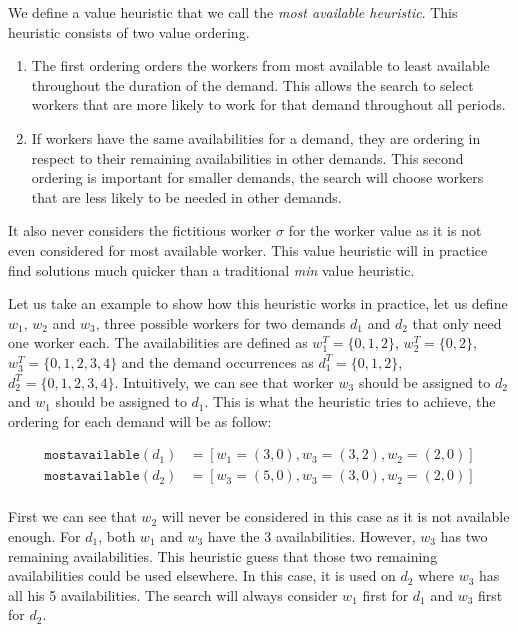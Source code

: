\documentclass[../../thesis.tex]{subfiles}
\begin{document}
We define a value heuristic that we call the \emph{most available heuristic}. 
This heuristic consists of two value ordering.
\begin{enumerate}
  \item The first ordering orders the workers from most available to least available throughout the duration of the demand.
        This allows the search to select workers that are more likely to work for that demand throughout all periods.
  \item If workers have the same availabilities for a demand, they are ordering in respect to their remaining availabilities in other demands. This 
        second ordering is important for smaller demands, the search will choose workers that are less likely to be needed in other demands.
\end{enumerate}

It also never considers the fictitious worker $\sigma$ for the worker value as it is not even considered 
for most available worker. This value heuristic will in practice find solutions much quicker than a traditional \emph{min} value heuristic.

Let us take an example to show how this heuristic works in practice, let us define 
$w_1$, $w_2$ and $w_3$, three possible workers for two demands $d_1$ and $d_2$ that only need one worker each.
The availabilities are defined as
$w_1^T = \{ 0, 1, 2 \}$, $w_2^T = \{ 0, 2 \}$, $w_3^T = \{ 0, 1, 2, 3, 4\}$ and the demand occurrences as 
$d_1^T = \{ 0, 1, 2 \}$, $d_2^T = \{ 0, 1, 2, 3, 4 \}$. Intuitively, we can see that worker 
$w_3$ should be assigned to $d_2$ and $w_1$ should be assigned to $d_1$. This is what the heuristic tries to achieve, the ordering for each demand will be as follow:

\begin{align*}
  \texttt{mostavailable}(d_1) &= [w_1 = (3, 0), w_3 = (3, 2), w_2 = (2, 0)] \\ 
  \texttt{mostavailable}(d_2) &= [w_3 = (5, 0), w_3 = (3, 0), w_2 = (2, 0)] \\ 
\end{align*}

First we can see that $w_2$ will never be considered in this case as it is not available enough. For $d_1$, both $w_1$ and $w_3$ have the 3 availabilities. However, 
$w_3$ has two remaining availabilities. This heuristic guess that those two remaining availabilities could be used elsewhere. In this case, it is used on $d_2$ where $w_3$ has all his 5 availabilities.
The search will always consider $w_1$ first for $d_1$ and $w_3$ first for $d_2$.
\end{document}
